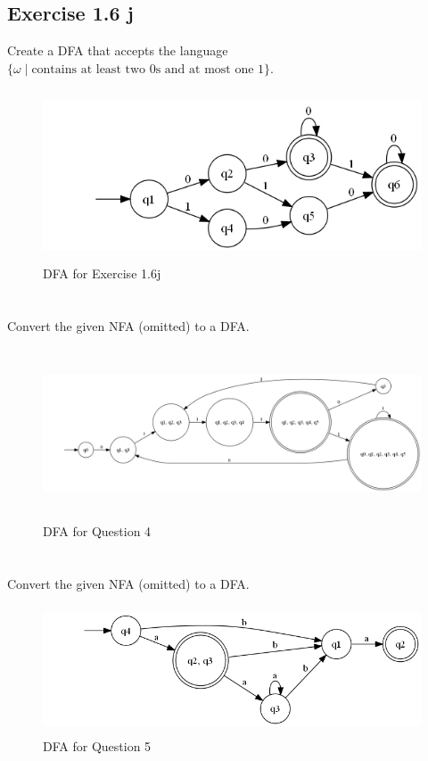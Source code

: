 \documentclass{article}
\newcommand{\where}{\mid}
\begin{document}
\subsection{Exercise 1.6 j}

Create a DFA that accepts the language $\{ \omega \where \text{contains at
least two 0s and at most one 1} \}$.

\begin{figure}[h!]
	\includegraphics[height=2.0in]{1_6_j.png}
	\caption{DFA for Exercise 1.6j}
\end{figure}

\section{}

Convert the given NFA (omitted) to a DFA.

\begin{figure}[h!]
	\includegraphics[height=2.0in]{4.png}
	\caption{DFA for Question 4}
\end{figure}

\section{}

Convert the given NFA (omitted) to a DFA. 

\begin{figure}[h!]
	\includegraphics[height=1.5in]{5.png}
	\caption{DFA for Question 5}
\end{figure}
\end{document}
